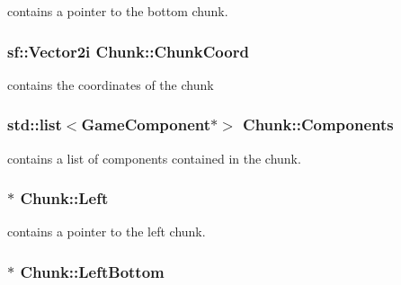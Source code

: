 contains a pointer to the bottom chunk. 

\hypertarget{class_chunk_abb5b1842148b3d7c616065766bfd2b33}{
\subsubsection[{Chunk\-Coord}]{\setlength{\rightskip}{0pt plus 5cm}sf\-::\-Vector2i Chunk\-::\-Chunk\-Coord\hspace{0.3cm}{\ttfamily [private]}}}\label{class_chunk_abb5b1842148b3d7c616065766bfd2b33}


contains the coordinates of the chunk 

\hypertarget{class_chunk_a4cdf6febd96ff99b681e37d548617a38}{
\subsubsection[{Components}]{\setlength{\rightskip}{0pt plus 5cm}std\-::list$<${\bf Game\-Component}$\ast$$>$ Chunk\-::\-Components\hspace{0.3cm}{\ttfamily [private]}}}\label{class_chunk_a4cdf6febd96ff99b681e37d548617a38}


contains a list of components contained in the chunk. 

\hypertarget{class_chunk_aee27c2584364a58dc8811e9ada0695dd}{
\subsubsection[{Left}]{$\ast$ Chunk\-::\-Left\hspace{0.3cm}{\ttfamily [private]}}}\label{class_chunk_aee27c2584364a58dc8811e9ada0695dd}


contains a pointer to the left chunk. 

\hypertarget{class_chunk_af3577f37139ffeb74181d9ce3c48f5e6}{
\subsubsection[{Left\-Bottom}]{$\ast$ Chunk\-::\-Left\-Bottom\hspace{0.3cm}{\ttfamily [private]}}}\label{class_chunk_af3577f37139ffeb74181d9ce3c48f5e6}


